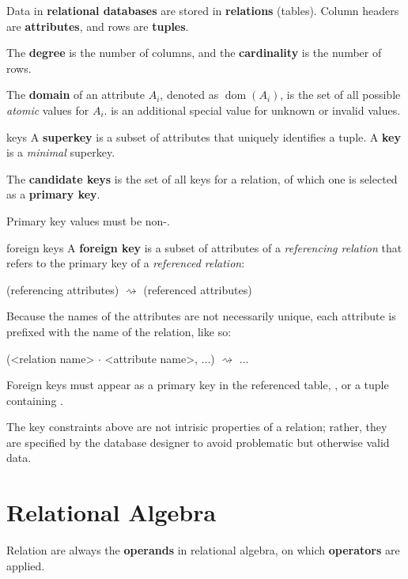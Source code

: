 Data in \textbf{relational databases} are stored in \textbf{relations} (tables).
Column headers are \textbf{attributes}, and rows are \textbf{tuples}.

The \textbf{degree} is the number of columns, and the \textbf{cardinality} is the number of rows.

The \textbf{domain} of an attribute $A_i$, denoted as $\operatorname*{dom}(A_i)$,
is the set of all possible \textit{atomic} values for $A_i$.
 is an additional special value for unknown or invalid values.


\begin{defn}{keys}
    A \textbf{superkey} is a subset of attributes that uniquely identifies a tuple.
    A \textbf{key} is a \textit{minimal} superkey.

    The \textbf{candidate keys} is the set of all keys for a relation, of which
    one is selected as a \textbf{primary key}.

    Primary key values must be non-.
\end{defn}

\begin{defn}{foreign keys}
    A \textbf{foreign key} is a subset of attributes of a \textit{referencing relation}
    that refers to the primary key of a \textit{referenced relation}:

    (referencing attributes) $\rightsquigarrow$ (referenced attributes)

    Because the names of the attributes are not necessarily unique,
    each attribute is prefixed with the name of the relation, like so:

    (<relation name> $\cdot$ <attribute name>, ...) $\rightsquigarrow$ ...

    Foreign keys must appear as a primary key in the referenced table,
    , or a tuple containing .
\end{defn}

The key constraints above are not intrisic properties of a relation; rather, they are specified by the database designer to avoid problematic but otherwise valid data.

\section{Relational Algebra}

Relation are always the \textbf{operands} in relational algebra, on which \textbf{operators} are applied.

